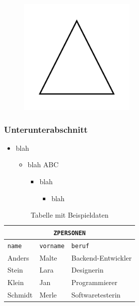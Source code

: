 \documentclass[             %
    final,                  %
    ngerman,                %
    paper=A4,               %
    paper=portrait,         %
    twoside,                %
    open=right,             %
    onecolumn,              %
    fontsize=11pt,          %
    BCOR=7.5mm,               %
    DIV=10,                 %
    titlepage=true,         %
    toc=bib,                %
    toc=idx,                %
    toc=listof,             %
    chapterentrydots=false, %
    numbers=noendperiod,    %
    captions=signature,     %
    captions=figuresignature,   %
    captions=tableheading,  %
    captions=nooneline,     %
    bibliography=openstyle, %
    automark                %
]{scrbook}                  %
\newcommand{\Index}[1]{#1\index{#1}}
\begin{document}
\begin{figure}[H]
    \centering
    \includegraphics[width=0.5\textwidth]{test.png}
    \caption{\blindtext}
    \label{fig:my_label}
\end{figure}
\subsubsection{Unterunterabschnitt}
\blindtext %
\begin{itemize}
    \item \Index{blah}
    \begin{itemize}
        \item blah \acs{ABC}
        \begin{itemize}
            \item blah
            \begin{itemize}
                \item blah
            \end{itemize}
        \end{itemize}
    \end{itemize}
\end{itemize}
\blindtext \cite{gon}
\begin{table}[H]
    \centering
    \begin{tabular}{|l|l|l|}
        \hline
        \multicolumn{3}{|c|}{\texttt{ZPERSONEN}}\\\hline
        \texttt{name} & \texttt{vorname} & \texttt{beruf}\\\hline
        Anders & Malte & Backend-Entwickler\\
        Stein & Lara & Designerin\\
        Klein & Jan & Programmierer\\
        Schmidt & Merle & Softwaretesterin\\\hline
    \end{tabular}
    \captionsetup{type=table,font=small,labelfont=bf,skip=0pt} %
    \setlength{\abovecaptionskip}{10pt} %
    \setlength{\belowcaptionskip}{15pt} %
    \caption{Tabelle mit Beispieldaten}
    \label{table:personen}
\end{table}
\end{document}
